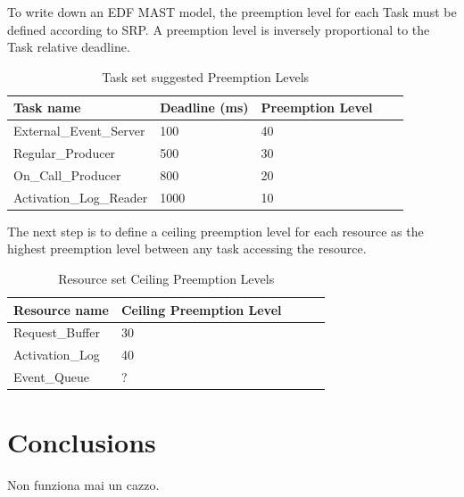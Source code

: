 \documentclass{article}
\begin{document}
To write down an EDF MAST model, the preemption level for each Task must be defined according to SRP.
A preemption level is inversely proportional to the Task relative deadline.

\begin{table}[!htbp]
   \centering
   \begin{tabular}{lllll}
     \toprule
     Task name & Deadline (ms) & Preemption Level \\
     \midrule
     External\_Event\_Server & 100 & 40 \\
     Regular\_Producer & 500 & 30 \\
     On\_Call\_Producer & 800 & 20 \\
     Activation\_Log\_Reader & 1000 & 10 \\
     \bottomrule
   \end{tabular}
   \caption{Task set suggested Preemption Levels}
   \label{tab:tasks-attributes}
\end{table}

The next step is to define a ceiling preemption level for each resource as the highest preemption level between any task accessing the resource.

\begin{table}[!htbp]
   \centering
   \begin{tabular}{lllll}
     \toprule
     Resource name & Ceiling Preemption Level \\
     \midrule
     Request\_Buffer & 30 \\
     Activation\_Log & 40 \\
     Event\_Queue    & ?  \\
     \bottomrule
   \end{tabular}
   \caption{Resource set Ceiling Preemption Levels}
   \label{tab:tasks-attributes}
\end{table}



\section{Conclusions}

Non funziona mai un cazzo.


\end{document}
